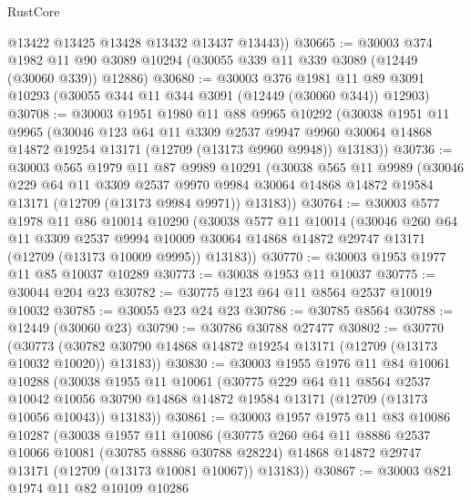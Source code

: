\begin{lexlean}{RustCore}
\begin{coremodule}
        @13422
        @13425
        @13428
        @13432
        @13437
        @13443))
@30665 := @30003
    @374
    @1982
    @11
    @90
    @3089
    @10294
    (@30055 @339 @11 @339 @3089 (@12449 (@30060 @339)) @12886)
@30680 := @30003
    @376
    @1981
    @11
    @89
    @3091
    @10293
    (@30055 @344 @11 @344 @3091 (@12449 (@30060 @344)) @12903)
@30708 := @30003
    @1951
    @1980
    @11
    @88
    @9965
    @10292
    (@30038
      @1951
      @11
      @9965
      (@30046
        @123
        @64
        @11
        @3309
        @2537
        @9947
        @9960
        @30064
        @14868
        @14872
        @19254
        @13171
        (@12709 (@13173 @9960 @9948))
        @13183))
@30736 := @30003
    @565
    @1979
    @11
    @87
    @9989
    @10291
    (@30038
      @565
      @11
      @9989
      (@30046
        @229
        @64
        @11
        @3309
        @2537
        @9970
        @9984
        @30064
        @14868
        @14872
        @19584
        @13171
        (@12709 (@13173 @9984 @9971))
        @13183))
@30764 := @30003
    @577
    @1978
    @11
    @86
    @10014
    @10290
    (@30038
      @577
      @11
      @10014
      (@30046
        @260
        @64
        @11
        @3309
        @2537
        @9994
        @10009
        @30064
        @14868
        @14872
        @29747
        @13171
        (@12709 (@13173 @10009 @9995))
        @13183))
@30770 := @30003 @1953 @1977 @11 @85 @10037 @10289
@30773 := @30038 @1953 @11 @10037
@30775 := @30044 @204 @23
@30782 := @30775 @123 @64 @11 @8564 @2537 @10019 @10032
@30785 := @30055 @23 @24 @23
@30786 := @30785 @8564
@30788 := @12449 (@30060 @23)
@30790 := @30786 @30788 @27477
@30802 := @30770
    (@30773 (@30782 @30790 @14868 @14872 @19254 @13171 (@12709 (@13173 @10032 @10020)) @13183))
@30830 := @30003
    @1955
    @1976
    @11
    @84
    @10061
    @10288
    (@30038
      @1955
      @11
      @10061
      (@30775
        @229
        @64
        @11
        @8564
        @2537
        @10042
        @10056
        @30790
        @14868
        @14872
        @19584
        @13171
        (@12709 (@13173 @10056 @10043))
        @13183))
@30861 := @30003
    @1957
    @1975
    @11
    @83
    @10086
    @10287
    (@30038
      @1957
      @11
      @10086
      (@30775
        @260
        @64
        @11
        @8886
        @2537
        @10066
        @10081
        (@30785 @8886 @30788 @28224)
        @14868
        @14872
        @29747
        @13171
        (@12709 (@13173 @10081 @10067))
        @13183))
@30867 := @30003 @821 @1974 @11 @82 @10109 @10286

\end{coremodule}
\end{lexlean}
